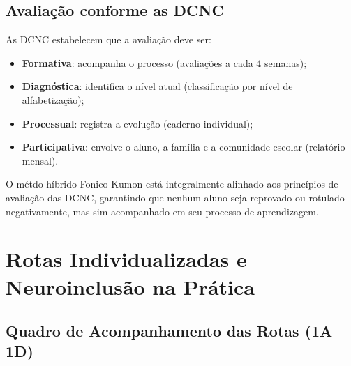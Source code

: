 \section{Avalia\c{c}\~{a}o conforme as DCNC}

As DCNC estabelecem que a avalia\c{c}\~{a}o deve ser:
\begin{itemize}[leftmargin=2cm]
  \item \textbf{Formativa}: acompanha o processo (avalia\c{c}\~{o}es
  a cada 4 semanas);
  \item \textbf{Diagn\'{o}stica}: identifica o n\'{i}vel atual
  (classifica\c{c}\~{a}o por n\'{i}vel de alfabetiza\c{c}\~{a}o);
  \item \textbf{Processual}: registra a evolu\c{c}\~{a}o (caderno
  individual);
  \item \textbf{Participativa}: envolve o aluno, a fam\'{i}lia e a
  comunidade escolar (relat\'{o}rio mensal).
\end{itemize}

O m\'{e}tdo h\'{i}brido Fonico-Kumon est\'{a} integralmente alinhado
aos princ\'{i}pios de avalia\c{c}\~{a}o das DCNC, garantindo que
nenhum aluno seja reprovado ou rotulado negativamente, mas sim
acompanhado em seu processo de aprendizagem.

\chapter{Rotas Individualizadas e Neuroinclusão na Prática}

\section{Quadro de Acompanhamento das Rotas (1A--1D)}

